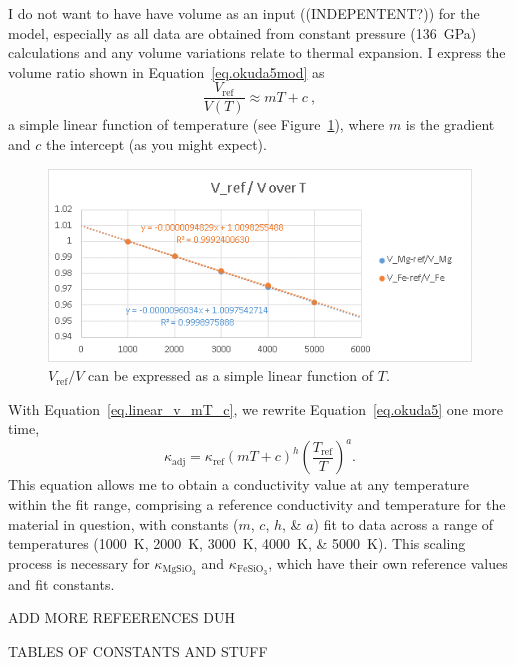 I do not want to have have volume as an input ((INDEPENTENT?)) for the model, especially as all data are obtained from constant pressure (136~GPa) calculations and any volume variations relate to thermal expansion. I express the volume ratio shown in Equation~\ref{eq.okuda5mod} as 
%
\begin{equation}
\frac{V_{\mathrm{ref}}}{V(T)} \approx  mT+c \ ,
\label{eq.linear_v_mT_c}
\end{equation}
%
a simple linear function of temperature (see Figure~\ref{fig:draft_VrefV-T}), where $m$ is the gradient and $c$ the intercept (as you might expect). 

\begin{figure}[h!]
  \includegraphics[width=\linewidth]{Figures/draft_VrefV-T.png}
  \caption{$V_{\mathrm{ref}}/V$ can be expressed as a simple linear function of $T$.}
  \label{fig:draft_VrefV-T}
\end{figure}

With Equation~\ref{eq.linear_v_mT_c}, we rewrite Equation~\ref{eq.okuda5} one more time,
%
\begin{equation}
\kappa_{\mathrm{adj}}=\kappa_{\mathrm{ref}} \left ( mT+c \right )^{h} \left ( \frac{T_{\mathrm{ref}}}{T} \right )^{a}.
\label{eq.okuda5modmod}
\end{equation}
%
This equation allows me to obtain a conductivity value at any temperature within the fit range, comprising a reference conductivity and temperature for the material in question, with constants ($m$, $c$, $h$, \& $a$) fit to data across a range of temperatures (1000~K, 2000~K, 3000~K, 4000~K, \& 5000~K). This scaling process is necessary for $\kappa_{\mathrm{MgSiO_{3}}}$ and $\kappa_{\mathrm{FeSiO_{3}}}$, which have their own reference values and fit constants.

ADD MORE REFEERENCES DUH

TABLES OF CONSTANTS AND STUFF


